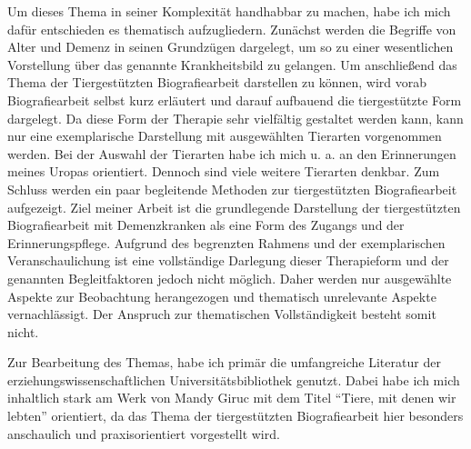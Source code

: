 Um dieses Thema in seiner Komplexität handhabbar zu machen, habe ich mich dafür entschieden es thematisch aufzugliedern. Zunächst werden die Begriffe von Alter und Demenz in seinen Grundzügen dargelegt, um so zu einer wesentlichen Vorstellung über das genannte Krankheitsbild zu gelangen. Um anschließend das Thema der Tiergestützten Biografiearbeit darstellen zu können, wird vorab Biografiearbeit selbst kurz erläutert und darauf aufbauend die tiergestützte Form dargelegt. Da diese Form der Therapie sehr vielfältig gestaltet werden kann, kann nur eine exemplarische Darstellung mit ausgewählten Tierarten vorgenommen werden. Bei der Auswahl der Tierarten habe ich mich u. a. an den Erinnerungen meines Uropas orientiert. Dennoch sind viele weitere Tierarten denkbar. Zum Schluss werden ein paar begleitende Methoden zur tiergestützten Biografiearbeit aufgezeigt.
Ziel meiner Arbeit ist die grundlegende Darstellung der tiergestützten Biografiearbeit mit Demenzkranken als eine Form des Zugangs und der Erinnerungspflege. Aufgrund des begrenzten Rahmens und der exemplarischen Veranschaulichung ist eine vollständige Darlegung dieser Therapieform und der genannten Begleitfaktoren jedoch nicht möglich. Daher werden nur ausgewählte Aspekte zur Beobachtung herangezogen und thematisch unrelevante Aspekte vernachlässigt. Der Anspruch zur thematischen Vollständigkeit besteht somit nicht.

Zur Bearbeitung des Themas, habe ich primär die umfangreiche Literatur der erziehungswissenschaftlichen Universitätsbibliothek genutzt. Dabei habe ich mich inhaltlich stark am Werk von Mandy Giruc mit dem Titel "`Tiere, mit denen wir lebten"' orientiert, da  das Thema der tiergestützten Biografiearbeit hier besonders anschaulich und praxisorientiert vorgestellt wird. 
